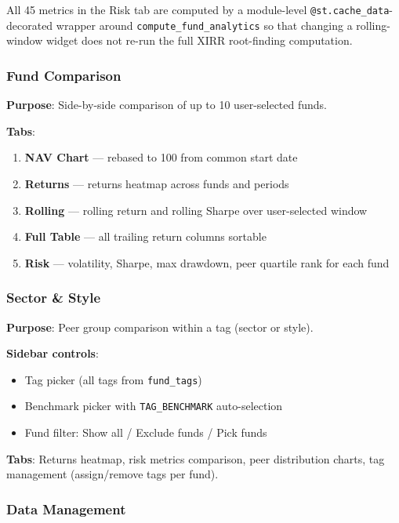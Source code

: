 \documentclass[12pt, a4paper]{article}
\begin{document}
All 45 metrics in the Risk tab are computed by a module-level
\texttt{@st.cache\_data}-decorated wrapper around \texttt{compute\_fund\_analytics}
so that changing a rolling-window widget does not re-run the full XIRR
root-finding computation.

\subsubsection{Fund Comparison}

\textbf{Purpose}: Side-by-side comparison of up to 10 user-selected funds.

\noindent\textbf{Tabs}:
\begin{enumerate}[noitemsep]
  \item \textbf{NAV Chart} — rebased to 100 from common start date
  \item \textbf{Returns} — returns heatmap across funds and periods
  \item \textbf{Rolling} — rolling return and rolling Sharpe over user-selected
    window
  \item \textbf{Full Table} — all trailing return columns sortable
  \item \textbf{Risk} — volatility, Sharpe, max drawdown, peer quartile rank
    for each fund
\end{enumerate}

\subsubsection{Sector \& Style}

\textbf{Purpose}: Peer group comparison within a tag (sector or style).

\noindent\textbf{Sidebar controls}:
\begin{itemize}[noitemsep]
  \item Tag picker (all tags from \texttt{fund\_tags})
  \item Benchmark picker with \texttt{TAG\_BENCHMARK} auto-selection
  \item Fund filter: Show all / Exclude funds / Pick funds
\end{itemize}

\noindent\textbf{Tabs}: Returns heatmap, risk metrics comparison, peer
distribution charts, tag management (assign/remove tags per fund).

\subsubsection{Data Management}
\end{document}

